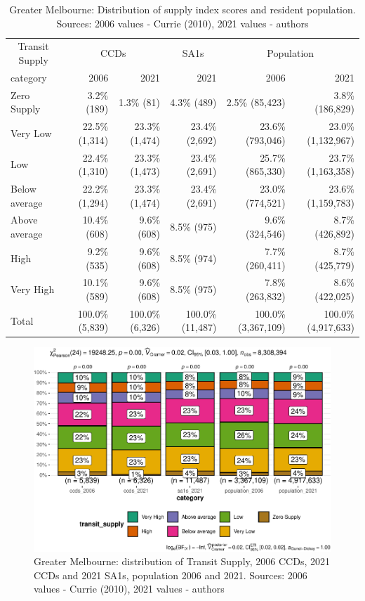 \documentclass[preprint, 3p,
authoryear]{elsarticle} %
\begin{document}
\begin{longtable}[t]{lrrrrr}
\caption{\label{tab:Greater_Melbourne_SA1_2021_table}Greater Melbourne: Distribution of supply index scores and resident population. Sources: 2006 values - Currie (2010), 2021 values - authors}\\
\toprule
\multicolumn{1}{c}{Transit Supply} & \multicolumn{2}{c}{CCDs} & \multicolumn{1}{c}{SA1s} & \multicolumn{2}{c}{Population} \\
\cmidrule(l{3pt}r{3pt}){1-1} \cmidrule(l{3pt}r{3pt}){2-3} \cmidrule(l{3pt}r{3pt}){4-4} \cmidrule(l{3pt}r{3pt}){5-6}
category & 2006 & 2021 & 2021 & 2006 & 2021\\
\midrule
Zero Supply & 3.2\%   (189) & 1.3\%    (81) & 4.3\%    (489) & 2.5\%    (85,423) & 3.8\%   (186,829)\\
Very Low & 22.5\% (1,314) & 23.3\% (1,474) & 23.4\%  (2,692) & 23.6\%   (793,046) & 23.0\% (1,132,967)\\
Low & 22.4\% (1,310) & 23.3\% (1,473) & 23.4\%  (2,691) & 25.7\%   (865,330) & 23.7\% (1,163,358)\\
Below average & 22.2\% (1,294) & 23.3\% (1,474) & 23.4\%  (2,691) & 23.0\%   (774,521) & 23.6\% (1,159,783)\\
Above average & 10.4\%   (608) & 9.6\%   (608) & 8.5\%    (975) & 9.6\%   (324,546) & 8.7\%   (426,892)\\
\addlinespace
High & 9.2\%   (535) & 9.6\%   (608) & 8.5\%    (974) & 7.7\%   (260,411) & 8.7\%   (425,779)\\
Very High & 10.1\%   (589) & 9.6\%   (608) & 8.5\%    (975) & 7.8\%   (263,832) & 8.6\%   (422,025)\\
Total & 100.0\% (5,839) & 100.0\% (6,326) & 100.0\% (11,487) & 100.0\% (3,367,109) & 100.0\% (4,917,633)\\
\bottomrule
\end{longtable}

\begin{figure}
\centering
\includegraphics{Leveraging_GTFS_to_assess_transit_supply_Transport_Geography_files/figure-latex/Greater_Melbourne_SA1_2021_table-1.pdf}
\caption{Greater Melbourne: distribution of Transit Supply, 2006 CCDs,
2021 CCDs and 2021 SA1s, population 2006 and 2021. Sources: 2006 values
- Currie (2010), 2021 values - authors}
\end{figure}
\end{document}
